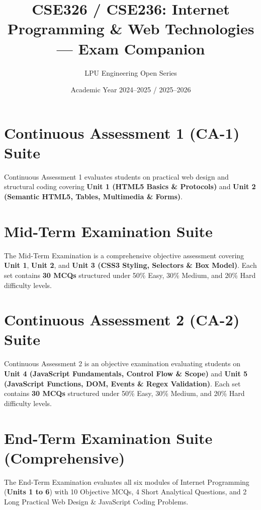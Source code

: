 \documentclass[a4paper,11pt,oneside,openany]{book}
\title{CSE326 / CSE236: Internet Programming \& Web Technologies --- Exam Companion}
\author{LPU Engineering Open Series}
\date{Academic Year 2024--2025 / 2025--2026}
\begin{document}
\frontmatter




\tableofcontents
\newpage

\mainmatter

\chapter{Continuous Assessment 1 (CA-1) Suite}
\label{chap:ca1}
\noindent
Continuous Assessment 1 evaluates students on practical web design and structural coding covering \textbf{Unit 1 (HTML5 Basics \& Protocols)} and \textbf{Unit 2 (Semantic HTML5, Tables, Multimedia \& Forms)}.

\newpage


\chapter{Mid-Term Examination Suite}
\label{chap:midterm}
\noindent
The Mid-Term Examination is a comprehensive objective assessment covering \textbf{Unit 1}, \textbf{Unit 2}, and \textbf{Unit 3 (CSS3 Styling, Selectors \& Box Model)}. Each set contains \textbf{30 MCQs} structured under 50\% Easy, 30\% Medium, and 20\% Hard difficulty levels.

\newpage


\chapter{Continuous Assessment 2 (CA-2) Suite}
\label{chap:ca2}
\noindent
Continuous Assessment 2 is an objective examination evaluating students on \textbf{Unit 4 (JavaScript Fundamentals, Control Flow \& Scope)} and \textbf{Unit 5 (JavaScript Functions, DOM, Events \& Regex Validation)}. Each set contains \textbf{30 MCQs} structured under 50\% Easy, 30\% Medium, and 20\% Hard difficulty levels.

\newpage


\chapter{End-Term Examination Suite (Comprehensive)}
\label{chap:endterm}
\noindent
The End-Term Examination evaluates all six modules of Internet Programming (\textbf{Units 1 to 6}) with 10 Objective MCQs, 4 Short Analytical Questions, and 2 Long Practical Web Design \& JavaScript Coding Problems.

\newpage

\end{document}
